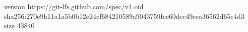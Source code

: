 version https://git-lfs.github.com/spec/v1
oid sha256:270e9b11a1a5b0b12e24cf684210589a9043759fce60dcc49eea36562d65c4d3
size 43840
